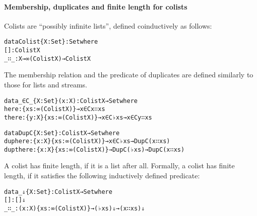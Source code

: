 \documentclass{eptcs}
\begin{document}
\paragraph{Membership, duplicates and finite length for colists}
Colists are ``possibly infinite lists'', defined coinductively as
follows:
\begin{alltt}
data Colist \{X : Set\} : Set where
  []  : Colist X
  _∷_ : X → ∞ (Colist X) → Colist X
\end{alltt}
The membership relation and the predicate of duplicates 
are defined similarly to those for lists and streams.
\begin{alltt}
data _∈C_ \{X : Set\} (x : X) : Colist X → Set where
  here  : \{xs : ∞ (Colist X)\} → x ∈C x ∷ xs
  there : \{y : X\} \{xs : ∞ (Colist X)\} → x ∈C ♭ xs → x ∈C y ∷ xs
\end{alltt}
\begin{alltt}
data DupC \{X : Set\} : Colist X → Set where
  duphere  : \{x : X\} \{xs : ∞ (Colist X)\} → x ∈C ♭ xs → DupC (x ∷ xs)
  dupthere : \{x : X\} \{xs : ∞ (Colist X)\} → DupC (♭ xs) → DupC (x ∷ xs)
\end{alltt}
A colist has finite length, if it is a list after all. Formally, a colist has
finite length, if it satisfies the following inductively defined predicate:
\begin{alltt}
data _⇓  \{X : Set\} : Colist X → Set where
  []  : [] ⇓
  _∷_ : (x : X) \{xs : ∞ (Colist X)\} → (♭ xs) ⇓ → (x ∷ xs) ⇓
\end{alltt}
\end{document}
